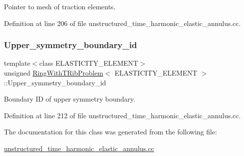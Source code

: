 Pointer to mesh of traction elements. 



Definition at line 206 of file unstructured\+\_\+time\+\_\+harmonic\+\_\+elastic\+\_\+annulus.\+cc.

\mbox{\label{classRingWithTRibProblem_ad15da3f1436b47c6cd7a79962aaa895d}} 
\subsubsection{\texorpdfstring{Upper\+\_\+symmetry\+\_\+boundary\+\_\+id}{Upper\_symmetry\_boundary\_id}}
{\footnotesize\ttfamily template$<$class E\+L\+A\+S\+T\+I\+C\+I\+T\+Y\+\_\+\+E\+L\+E\+M\+E\+NT$>$ \\
unsigned \hyperlink{classRingWithTRibProblem}{Ring\+With\+T\+Rib\+Problem}$<$ E\+L\+A\+S\+T\+I\+C\+I\+T\+Y\+\_\+\+E\+L\+E\+M\+E\+NT $>$\+::Upper\+\_\+symmetry\+\_\+boundary\+\_\+id\hspace{0.3cm}{\ttfamily [private]}}



Boundary ID of upper symmetry boundary. 



Definition at line 212 of file unstructured\+\_\+time\+\_\+harmonic\+\_\+elastic\+\_\+annulus.\+cc.



The documentation for this class was generated from the following file\+:\begin{DoxyCompactItemize}
\item 
\hyperlink{unstructured__time__harmonic__elastic__annulus_8cc}{unstructured\+\_\+time\+\_\+harmonic\+\_\+elastic\+\_\+annulus.\+cc}\end{DoxyCompactItemize}

